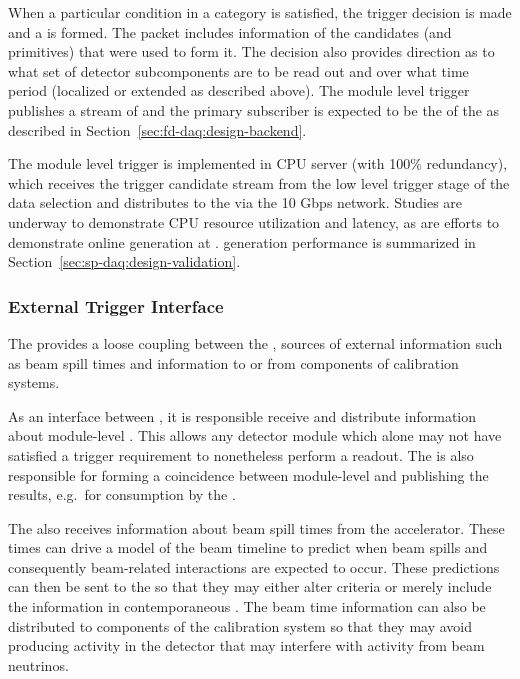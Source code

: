 When a particular condition in a category is satisfied, the trigger
decision is made and a  is formed. 
The  packet includes information of the candidates (and primitives)
that were used to form it. 
The decision also provides direction as to what set of detector subcomponents
are to be read out and over what time period (localized or extended as described above). 
The module level trigger publishes a stream of  and the primary subscriber is expected to be the  of the  as described in Section~\ref{sec:fd-daq:design-backend}.

The module level trigger is implemented in  CPU server (with 100\%
redundancy), which
receives the trigger candidate stream from the low level trigger stage
of the data selection and distributes  to the
 via the 10 Gbps  network. Studies are
underway to demonstrate CPU resource utilization and latency, as are
efforts to demonstrate online  generation at .
 generation performance is summarized in
Section~\ref{sec:sp-daq:design-validation}.

\subsubsection{External Trigger Interface}

The  provides a loose coupling between the
, sources of external information such as beam spill times
and information to or from components of   calibration systems. 

As an interface between , it is responsible receive and distribute information about module-level  .
This allows any detector module which alone may not have satisfied a  trigger requirement to nonetheless perform a  readout.
The  is also responsible for forming a coincidence between module-level   and publishing the results, e.g.~for consumption by the .

The  also receives information about beam spill times from the accelerator.
These times can drive a model of the beam timeline to predict when
beam spills and consequently beam-related interactions are expected to occur. 
These predictions can then be sent to the  so that they
may either alter  criteria or merely include the
information in contemporaneous . The beam time information can also be distributed to components of the calibration system so that they may avoid producing activity in the detector that may interfere with activity from beam neutrinos.

